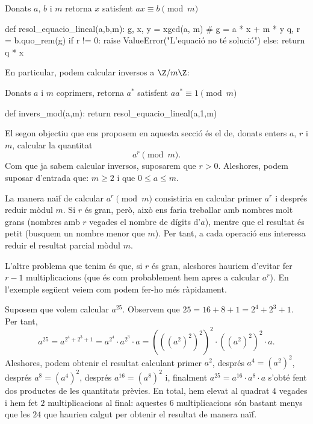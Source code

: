  \begin{algorithm}
 \caption{Donats $a$, $b$ i $m$ retorna $x$ satisfent $ax\equiv b\pmod m$}
 \begin{python}
 def resol_equacio_lineal(a,b,m):
    g, x, y = xgcd(a, m) # g = a * x + m * y
    q, r = b.quo_rem(g)
    if r != 0:
        raise ValueError("L'equació no té solució")
    else:
        return q * x
 \end{python}
  \end{algorithm}
 
 En particular, podem calcular inversos a $\Z/m\Z$:
 
 \begin{algorithm}
 \caption{Donats $a$ i $m$ coprimers, retorna $a^*$ satisfent $aa^*\equiv 1\pmod m$}
 \begin{python}
 def invers_mod(a,m):
     return resol_equacio_lineal(a,1,m)
 \end{python}
 \end{algorithm}
 
  El segon objectiu que ens proposem en aquesta secció és el de, donats enters $a$, $r$ i $m$, calcular la quantitat
  \[
  a^r\pmod{m}.
  \]
  Com que ja sabem calcular inversos, suposarem que $r>0$. Aleshores, podem suposar d'entrada que: $m\geq 2$ i que $0\leq a\leq m$.
 
  La manera naïf de calcular $a^r\pmod{m}$ consistiria en calcular primer $a^r$ i després reduir mòdul $m$. Si $r$ és gran, però, això ens faria treballar amb nombres molt grans (nombres amb $r$ vegades el nombre de dígits d'$a$), mentre que el resultat és petit (busquem un nombre menor que $m$). Per tant, a cada operació ens interessa reduir el resultat parcial mòdul $m$.
  
 L'altre problema que tenim és que, si $r$ és gran, aleshores hauriem d'evitar fer $r-1$ multiplicacions (que és com probablement hem apres a calcular $a^r$). En l'exemple següent veiem com podem fer-ho més ràpidament.
 
 \begin{example}
  Suposem que volem calcular $a^{25}$. Observem que $25=16+8+1 = 2^4+2^3+1$. Per tant,
  \[
  a^{25} = a^{2^4+2^3+1}=a^{2^4}\cdot a^{2^3}\cdot a = (((a^2)^2)^2)^2\cdot ((a^2)^2)^2\cdot a.
  \]
  Aleshores, podem obtenir el resultat calculant primer $a^2$, després $a^4 = (a^2)^2$, després $a^8=(a^4)^2$, després $a^{16}=(a^8)^2$ i, finalment $a^{25}=a^{16}\cdot a^8\cdot a$ s'obté fent dos productes de les quantitats prèvies. En total, hem elevat al quadrat $4$ vegades i hem fet $2$ multiplicacions al final: aquestes $6$ multiplicacions són bastant menys que les $24$ que haurien calgut per obtenir el resultat de manera naïf.
 \end{example}
 
